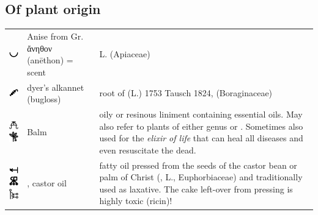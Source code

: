 \documentclass[british,final,landscape]{scrartcl}
\begin{document}
\begin{refsection}
\subsection{Of plant origin}


 \tablelasttail{\bottomrule}\label{tab:plant}
 \begin{supertabular}{p{0.3\textwidth}p{0.34\textwidth}p{0.34\textwidth}}
   \includegraphics[width=5mm]{Plant/Anise} & Anise from Gr. \foreignlanguage{greek}{ἄνηθον} (anēthon) = scent &  L. (Apiaceae) \\
   \includegraphics[width=5mm]{Plant/Alkannet} & dyer's alkannet (bugloss) & root of  (L.) 1753 Tausch 1824, (Boraginaceae) \\
   \includegraphics[width=5mm]{Plant/Balm} \includegraphics[width=5mm]{Plant/Balm2} & Balm & oily or resinous liniment containing essential oils. May also refer to plants of either genus  or . Sometimes also used for the \emph{elixir of life} that can heal all diseases and even resuscitate the dead. \\
   \includegraphics[width=5mm]{Plant/CastorOil} \includegraphics[width=5mm]{Plant/CastorOil2} \includegraphics[width=5mm]{Plant/CastorOil3} & , castor oil & fatty oil pressed from the seeds of the castor bean or palm of Christ (,  L., Euphorbiaceae) and traditionally used as laxative. The cake left-over from pressing is highly toxic (ricin)! \\

\end{supertabular}
\end{refsection}
\end{document}

